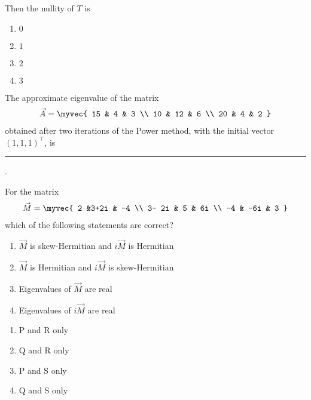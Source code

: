 Then the nullity of $T$ is
\hfill{}
\begin{multicols}{4}
\begin{enumerate}
  \item $0$
  \item $1$
  \item $2$
  \item $3$
\end{enumerate}
\end{multicols}
\item
The approximate eigenvalue of the matrix
\begin{align*}
\vec{A} = \myvec{
15 & 4 & 3 \\
10 & 12 & 6 \\
20 & 4 & 2
}
\end{align*}
obtained after two iterations of the Power method, with the initial vector $(1,1,1)^{\top}$, is
\rule{1cm}{0.01pt}.
\hfill{}
\iffalse
\begin{multicols}{4}
\begin{enumerate}
  \item $7.768$
  \item $9.468$
  \item $10.548$
  \item $19.468$
\end{enumerate}
\end{multicols}
\fi
\item
For the matrix
\begin{align*}
    \vec{M} = \myvec{
	    2 &3+2i & -4 \\ 3- 2i & 5 & 6i \\ -4 & -6i & 3
}
\end{align*}
which of the following statements are correct?
\hfill{}
\begin{enumerate}[label=\Alph*., start=16]
\item $\vec{M}$ is skew-Hermitian and $i\vec{M}$ is Hermitian
\item $\vec{M}$ is Hermitian and $i\vec{M}$ is skew-Hermitian
\item Eigenvalues of $\vec{M}$ are real
\item Eigenvalues of $i\vec{M}$ are real
\end{enumerate}
\begin{multicols}{4}
\begin{enumerate}
\item P and R only
\item Q and R only
\item P and S only
\item Q and S only
\end{enumerate}
\end{multicols}
